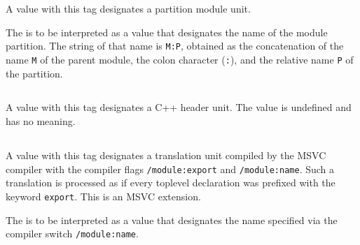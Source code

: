 A  value with this tag designates a partition module unit.

The  is to be interpreted as a  value that designates the name of the module partition.  
The string of that name is \texttt{M:P}, obtained as the concatenation of the name \texttt{M} of the parent module, 
the colon character (\texttt{:}), and the relative name \texttt{P} of the partition.

\subsection{}
\label{sec:ifc:UnitSort:Header}

A  value with this tag designates a C++ header unit.  The  value is undefined and has no meaning.


\subsection{}
\label{sec:ifc:UnitSort:ExportedTU}

A  value with this tag designates a translation unit compiled by the MSVC compiler with the compiler flags
\texttt{/module:export} and \texttt{/module:name}.  Such a translation is processed as if every toplevel declaration was
prefixed with the keyword \texttt{export}.  This is an MSVC extension.

The  is to be interpreted as a  value that designates the name specified via the compiler
switch \texttt{/module:name}.


